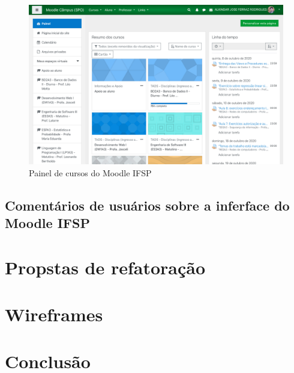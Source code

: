 \documentclass[11pt]{article}
\begin{document}
\begin{figure}[htbp]
\centering
\includegraphics[width=.9\linewidth]{./media/painel.png}
\caption{\label{fig:orgd56bb7d}Painel de cursos do Moodle IFSP}
\end{figure}



\subsection*{Comentários de usuários sobre a inferface do Moodle IFSP}
\label{sec:org988a5ca}


\section*{Propstas de refatoração}
\label{sec:org9fed00b}

\section*{Wireframes}
\label{sec:org4cee4ac}

\section*{Conclusão}
\label{sec:org6b91cb5}
\end{document}
